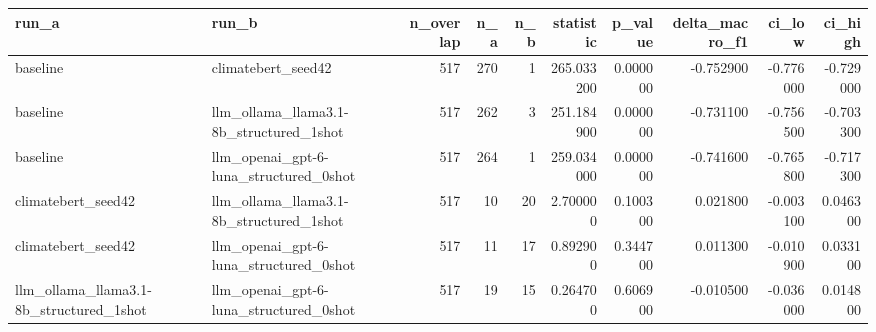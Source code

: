 \begin{tabular}{llrrrrrrrr}
\toprule
run_a & run_b & n_overlap & n_a & n_b & statistic & p_value & delta_macro_f1 & ci_low & ci_high \\
\midrule
baseline & climatebert_seed42 & 517 & 270 & 1 & 265.033200 & 0.000000 & -0.752900 & -0.776000 & -0.729000 \\
baseline & llm_ollama_llama3.1-8b_structured_1shot & 517 & 262 & 3 & 251.184900 & 0.000000 & -0.731100 & -0.756500 & -0.703300 \\
baseline & llm_openai_gpt-6-luna_structured_0shot & 517 & 264 & 1 & 259.034000 & 0.000000 & -0.741600 & -0.765800 & -0.717300 \\
climatebert_seed42 & llm_ollama_llama3.1-8b_structured_1shot & 517 & 10 & 20 & 2.700000 & 0.100300 & 0.021800 & -0.003100 & 0.046300 \\
climatebert_seed42 & llm_openai_gpt-6-luna_structured_0shot & 517 & 11 & 17 & 0.892900 & 0.344700 & 0.011300 & -0.010900 & 0.033100 \\
llm_ollama_llama3.1-8b_structured_1shot & llm_openai_gpt-6-luna_structured_0shot & 517 & 19 & 15 & 0.264700 & 0.606900 & -0.010500 & -0.036000 & 0.014800 \\
\bottomrule
\end{tabular}
